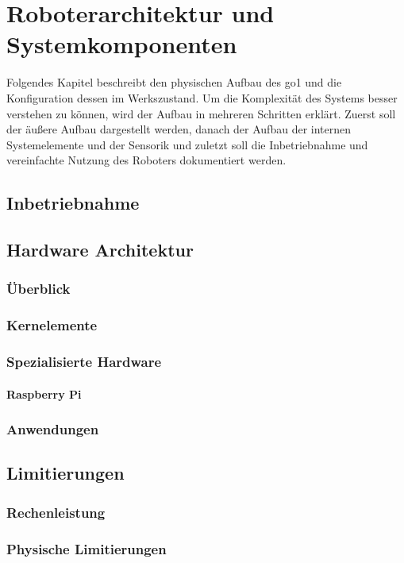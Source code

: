\section{Roboterarchitektur und Systemkomponenten}

Folgendes Kapitel beschreibt den physischen Aufbau des \gls{go1} und die Konfiguration dessen im Werkszustand.
Um die Komplexität des Systems besser verstehen zu können, wird der Aufbau in mehreren Schritten erklärt.
Zuerst soll der äußere Aufbau dargestellt werden, danach der Aufbau der internen Systemelemente und der Sensorik und zuletzt
soll die Inbetriebnahme und vereinfachte Nutzung des Roboters dokumentiert werden.




\subsection{Inbetriebnahme}

\subsection{Hardware Architektur}

\subsubsection{Überblick}

\subsubsection{Kernelemente}



\subsubsection{Spezialisierte Hardware}
\paragraph{Raspberry Pi}
\label{par:raspi}

\subsubsection{Anwendungen}
\label{subsubsec:app_and_web}


\subsection{Limitierungen}
\subsubsection{Rechenleistung}
\subsubsection{Physische Limitierungen}